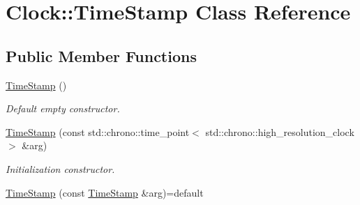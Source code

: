 \hypertarget{class_clock_1_1_time_stamp}{}\section{Clock\+:\+:Time\+Stamp Class Reference}
\label{class_clock_1_1_time_stamp}
\subsection*{Public Member Functions}
\begin{DoxyCompactItemize}
\item 
\hyperlink{class_clock_1_1_time_stamp_aac68c3609da3356d7b02c7a35c892a23}{Time\+Stamp} ()\hypertarget{class_clock_1_1_time_stamp_aac68c3609da3356d7b02c7a35c892a23}{}\label{class_clock_1_1_time_stamp_aac68c3609da3356d7b02c7a35c892a23}

\begin{DoxyCompactList}\small\item\em Default empty constructor. \end{DoxyCompactList}\item 
\hyperlink{class_clock_1_1_time_stamp_af60062cc13bad94c9de46c93c7c9d4cd}{Time\+Stamp} (const std\+::chrono\+::time\+\_\+point$<$ std\+::chrono\+::high\+\_\+resolution\+\_\+clock $>$ \&arg)\hypertarget{class_clock_1_1_time_stamp_af60062cc13bad94c9de46c93c7c9d4cd}{}\label{class_clock_1_1_time_stamp_af60062cc13bad94c9de46c93c7c9d4cd}

\begin{DoxyCompactList}\small\item\em Initialization constructor. \end{DoxyCompactList}\item 
\hyperlink{class_clock_1_1_time_stamp_a9232a95105c59c2154373b6bd1459c87}{Time\+Stamp} (const \hyperlink{class_clock_1_1_time_stamp}{Time\+Stamp} \&arg)=default\hypertarget{class_clock_1_1_time_stamp_a9232a95105c59c2154373b6bd1459c87}{}\label{class_clock_1_1_time_stamp_a9232a95105c59c2154373b6bd1459c87}


\end{DoxyCompactItemize}
